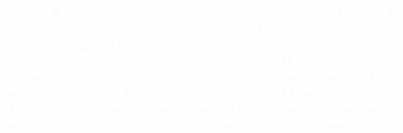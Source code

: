 \documentclass[letterpaper,11pt]{article}
\begin{document}

\vspace{-3pt}
\tiny\textcolor{White}{Keywords: Industry Experience, Algorithm, Software Development, Full stack application, Machine Learning, Natural Language Processing, Computer Vision}
\vspace{-10pt}
\tiny\textcolor{White}{Deep Learning, Data Visualization, Predictive Analysis, Clustering \& Classification, Web Scraping, Model Development, Model Evaluation, Scalable Pipelines, SQL}
\vspace{-10pt}
\tiny\textcolor{White}{Numpy, Sklearn, Linear Regression, XGBoost, word2vec, ELMo word embedding, BERT, Decision Trees, CART, Random Forests, Ensemble Models}
\vspace{-10pt}
\tiny\textcolor{White}{Machine Learning Engineer, Software Engineer, Software Developer, DevOps, Data Engineer, SDE I, SDE II, Agile Development, Websockets}
\end{document}
